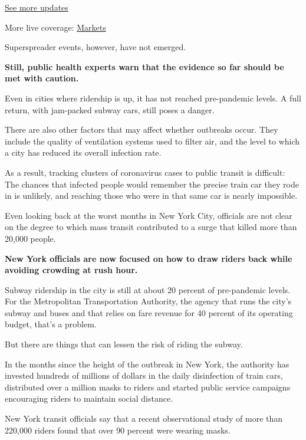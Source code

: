 \href{https://www.nytimes.com/2020/08/04/world/coronavirus-cases.html?action=click\&pgtype=Article\&state=default\&region=MAIN_CONTENT_1\&context=storylines_live_updates}{See
more updates}

More live coverage:
\href{https://www.nytimes.com/live/2020/08/04/business/stock-market-today-coronavirus?action=click\&pgtype=Article\&state=default\&region=MAIN_CONTENT_1\&context=storylines_live_updates}{Markets}

Superspreader events, however, have not emerged.

\textbf{Still, public health experts warn that the evidence so far
should be met with caution.}

Even in cities where ridership is up, it has not reached pre-pandemic
levels. A full return, with jam-packed subway cars, still poses a
danger.

There are also other factors that may affect whether outbreaks occur.
They include the quality of ventilation systems used to filter air, and
the level to which a city has reduced its overall infection rate.

As a result, tracking clusters of coronavirus cases to public transit is
difficult: The chances that infected people would remember the precise
train car they rode in is unlikely, and reaching those who were in that
same car is nearly impossible.

Even looking back at the worst months in New York City, officials are
not clear on the degree to which mass transit contributed to a surge
that killed more than 20,000 people.

\textbf{New York officials are now focused on how to draw riders back
while avoiding crowding at rush hour.}

Subway ridership in the city is still at about 20 percent of
pre-pandemic levels. For the Metropolitan Transportation Authority, the
agency that runs the city's subway and buses and that relies on fare
revenue for 40 percent of its operating budget, that's a problem.

But there are things that can lessen the risk of riding the subway.

In the months since the height of the outbreak in New York, the
authority has invested hundreds of millions of dollars in the daily
disinfection of train cars, distributed over a million masks to riders
and started public service campaigns encouraging riders to maintain
social distance.

New York transit officials say that a recent observational study of more
than 220,000 riders found that over 90 percent were wearing masks.

